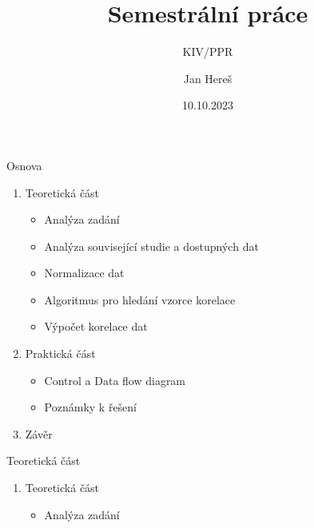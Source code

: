 \documentclass[aspectratio=169, xcolor=dvipsnames]{beamer}
\title{Semestrální práce}
\subtitle{KIV/PPR}
\author{Jan Hereš}
\date{10.10.2023}
\begin{document}
\begin{frame}
	\titlepage
\end{frame}

\begin{frame}{Osnova}
	\begin{enumerate}
    \item Teoretická část
      \begin{itemize}
        \item Analýza zadání 
        \item Analýza související studie a dostupných dat 
        \item Normalizace dat
        \item Algoritmus pro hledání vzorce korelace
        \item Výpočet korelace dat
      \end{itemize}

    \item Praktická část
      \begin{itemize}
        \item Control a Data flow diagram
        \item Poznámky k řešení
      \end{itemize}
    \item Závěr
  \end{enumerate}
\end{frame}

\begin{frame}
 \begin{center}
    Teoretická část 
 \end{center} 
\end{frame}

\begin{frame}{}
	\begin{center}
\begin{enumerate}
    \item Teoretická část
      \begin{itemize}
        \item Analýza zadání 
       \end{itemize}
   \end{enumerate}
	\end{center}
\end{frame}
\end{document}
